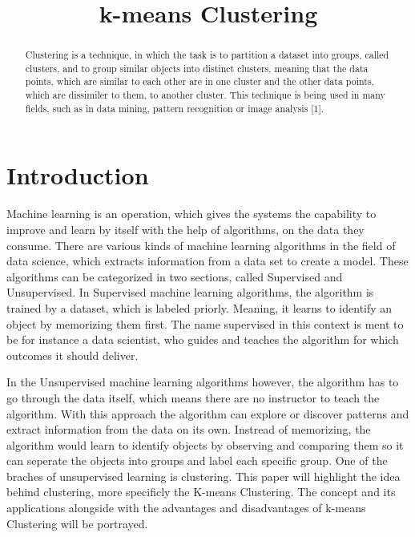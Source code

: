 \documentclass[conference]{IEEEtran}
\begin{document}
\title{k-means Clustering\\
}

\author{

}

\maketitle

\begin{abstract}
Clustering is a technique, in which the task is to partition a dataset into groups, called clusters, and to group similar objects into distinct clusters, meaning that the data points, which are similar to each other are in one cluster and the other data points, which are dissimiler to them, to another cluster. This technique is being used in many fields, such as in data mining, pattern recognition or image analysis [1].
\end{abstract}

\begin{IEEEkeywords}

\end{IEEEkeywords}

\section{Introduction}
Machine learning is an operation, which gives the systems the capability to improve and learn by itself with the help of algorithms, on the data they consume. There are various kinds of machine learning algorithms in the field of data science, which extracts information from a data set to create a model. These algorithms can be categorized in two sections, called Supervised and Unsupervised. In Supervised machine learning algorithms, the algorithm is trained by a dataset, which is labeled priorly. Meaning, it learns to identify an object by memorizing them first. The name supervised in this context is ment to be for instance a data scientist, who guides and teaches the algorithm for which outcomes it should deliver.

In the Unsupervised machine learning algorithms however, the algorithm has to go through the data itself, which means there are no instructor to teach the algorithm. With this approach the algorithm can explore or discover patterns and extract information from the data on its own. Instread of memorizing, the algorithm would learn to identify objects by observing and comparing them so it can seperate the objects into groups and label each specific group. One of the braches of unsupervised learning is clustering. This paper will highlight the idea behind clustering, more specificly the K-means Clustering. The concept and its applications alongside with the advantages and disadvantages of k-means Clustering will be portrayed.
\end{document}
